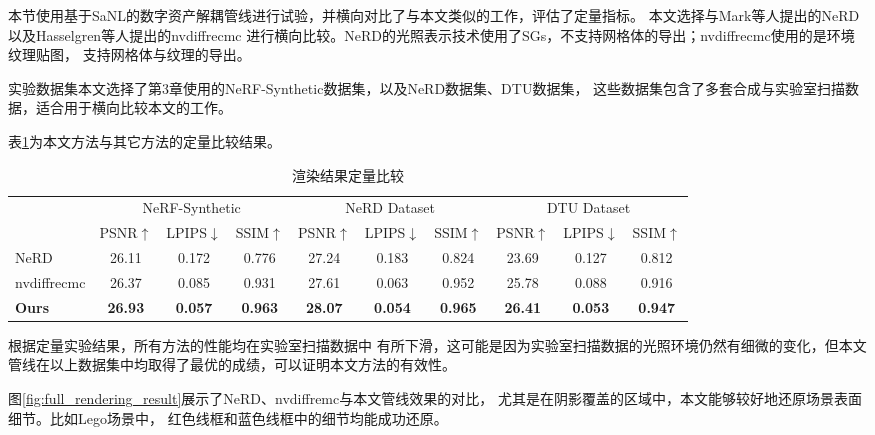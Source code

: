 本节使用基于SaNL的数字资产解耦管线进行试验，并横向对比了与本文类似的工作，评估了定量指标。
本文选择与Mark等人\cite{Boss_2021}提出的NeRD以及Hasselgren等人\cite{10.5555/3600270.3601931}提出的nvdiffrecmc
进行横向比较。NeRD的光照表示技术使用了SGs，不支持网格体的导出；nvdiffrecmc使用的是环境纹理贴图，
支持网格体与纹理的导出。

实验数据集本文选择了第3章使用的NeRF-Synthetic数据集，以及NeRD数据集、DTU数据集\cite{jensen2014large}，
这些数据集包含了多套合成与实验室扫描数据，适合用于横向比较本文的工作。

表\ref{tab:dataset_comparison}为本文方法与其它方法的定量比较结果。
\begin{table}[h]
  \centering
  \caption{渲染结果定量比较}
  \begin{tabular}{l ccc ccc ccc}
      \toprule
      & \multicolumn{3}{c}{NeRF-Synthetic} & \multicolumn{3}{c}{NeRD Dataset} & \multicolumn{3}{c}{DTU Dataset} \\
      \cmidrule(lr){2-4} \cmidrule(lr){5-7} \cmidrule(lr){8-10}
      & PSNR$\uparrow$ & LPIPS$\downarrow$ & SSIM$\uparrow$ & PSNR$\uparrow$ & LPIPS$\downarrow$ & SSIM$\uparrow$ & PSNR$\uparrow$ & LPIPS$\downarrow$ & SSIM$\uparrow$ \\
      \midrule
      NeRD & 26.11 & 0.172 & 0.776 & 27.24 & 0.183 & 0.824 & 23.69 & 0.127 & 0.812 \\
      nvdiffrecmc & 26.37 & 0.085 & 0.931 & 27.61 & 0.063 & 0.952 & 25.78 & 0.088 & 0.916 \\
      \textbf{Ours} & \textbf{26.93} & \textbf{0.057} & \textbf{0.963} & \textbf{28.07} & \textbf{0.054} & \textbf{0.965} & \textbf{26.41} & \textbf{0.053} & \textbf{0.947} \\
      \bottomrule
  \end{tabular}
  \label{tab:dataset_comparison}
\end{table}

根据定量实验结果，所有方法的性能均在实验室扫描数据中
有所下滑，这可能是因为实验室扫描数据的光照环境仍然有细微的变化，但本文管线在以上数据集中均取得了最优的成绩，可以证明本文方法的有效性。

图\ref{fig:full_rendering_result}展示了NeRD、nvdiffremc\cite{10.5555/3600270.3601931}与本文管线效果的对比，
尤其是在阴影覆盖的区域中，本文能够较好地还原场景表面细节。比如Lego场景中，
红色线框和蓝色线框中的细节均能成功还原。

